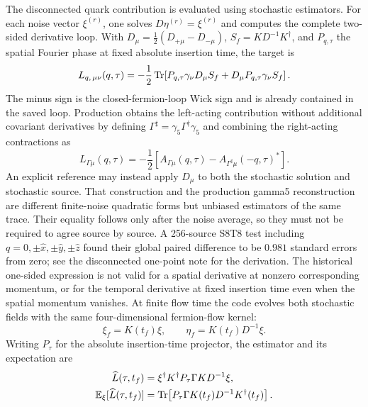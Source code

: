\documentclass[11pt,a4paper]{article}
\begin{document}
The disconnected quark contribution is evaluated using stochastic estimators.
For each noise vector $\xi^{(r)}$, one solves $D\eta^{(r)} = \xi^{(r)}$ and
computes the complete two-sided derivative loop.  With
$D_\mu=\tfrac12(D_{+\mu}-D_{-\mu})$,
$S_f=K D^{-1}K^\dagger$, and $P_{q,\tau}$ the spatial Fourier phase at fixed
absolute insertion time, the target is
\begin{equation}
  L_{q,\,\mu\nu}(q,\tau)
  =-\frac12\Tr\!\left[
    P_{q,\tau}\gamma_\nu D_\mu S_f
    +D_\mu P_{q,\tau}\gamma_\nu S_f\right].
\end{equation}
The minus sign is the closed-fermion-loop Wick sign and is already contained
in the saved loop.  Production obtains the left-acting contribution without
additional covariant derivatives by defining
$\Gamma^\sharp=\gamma_5\Gamma^\dagger\gamma_5$ and combining the right-acting
contractions as
\begin{equation}
 L_{\Gamma\mu}(q,\tau)=-\frac12\left[
 A_{\Gamma\mu}(q,\tau)-A_{\Gamma^\sharp\mu}(-q,\tau)^*\right].
\end{equation}
An explicit reference may instead apply \(D_\mu\) to both the stochastic
solution and stochastic source.  That construction and the production
gamma5 reconstruction are different finite-noise quadratic forms but unbiased
estimators of the same trace.  Their equality follows only after the noise
average, so they must not be required to agree source by source.  A 256-source
S8T8 test including \(q=0,\pm\hat x,\pm\hat y,\pm\hat z\) found their global
paired difference to be \(0.981\) standard errors from zero; see the
disconnected one-point note for the derivation.
The historical one-sided expression is not valid for a spatial derivative at
nonzero corresponding momentum, or for the temporal derivative at fixed
insertion time even when the spatial momentum vanishes.
At finite flow time the code evolves both stochastic fields with the same
four-dimensional fermion-flow kernel:
\begin{equation}
  \xi_f=K(t_f)\xi,
  \qquad
  \eta_f=K(t_f)D^{-1}\xi.
\end{equation}
Writing \(P_\tau\) for the absolute insertion-time projector, the estimator and
its expectation are
\begin{align}
  \widehat L(\tau,t_f)
  &=\xi^\dagger K^\dagger P_\tau\Gamma K D^{-1}\xi,
  \\
  \mathbb{E}_\xi[\widehat L(\tau,t_f)]
  &=\Tr\!\left[P_\tau\Gamma K(t_f)D^{-1}K^\dagger(t_f)\right].
  \label{eq:proton_full_volume_flowed_loop}
\end{align}
\end{document}

